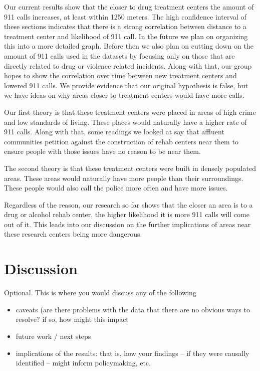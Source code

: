 \documentclass[12pt]{article}
\begin{document}
Our current results show that the closer to drug treatment centers the  amount of 911 calls increases, at least within 1250 meters. The high confidence interval of these sections indicates that there is a strong correlation between distance to a treatment center and likelihood of 911 call. In the future we plan on organizing this into a more detailed graph. Before then we also plan on cutting down on the amount of 911 calls used in the datasets by focusing only on those that are directly related to drug or violence related incidents. Along with that, our group hopes to show the correlation over time between new treatment centers and lowered 911 calls. We provide evidence that our original hypothesis is false, but we have ideas on why areas closer to treatment centers would have more calls.

Our first theory is that these treatment centers were placed in areas of high crime and low standards of living. These places would naturally have a higher rate of 911 calls. Along with that, some readings we looked at say that affluent communities petition against the construction of rehab centers near them to ensure people with those issues have no reason to be near them.

The second theory is that these treatment centers were built in densely populated areas. These areas would naturally have more people than their surroundings. These people would also call the police more often and have more issues.

Regardless of the reason, our research so far shows that the closer an area is to a drug or alcohol rehab center, the higher likelihood it is more 911 calls will come out of it. This leads into our discussion on the further implications of areas near these research centers being more dangerous.

\section{Discussion}
\label{sec:discussion}

Optional. This is where you would discuss any of the following
\begin{itemize}
    \item caveats (are there problems with the data that there are no obvious ways to resolve? if so, how might this impact
    \item future work / next steps
    \item     implications of the results: that is, how your findings -- if they were causally identified -- might inform policymaking, etc.
    \end{itemize}
\end{document}
